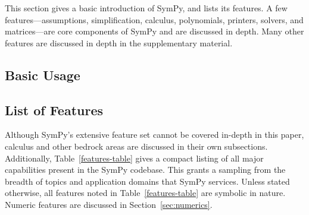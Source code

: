 This section gives a basic introduction of SymPy, and lists its features.
A few features---assumptions, simplification, calculus, polynomials, printers,
solvers, and matrices---are core components of SymPy and are discussed in
depth. Many other features are discussed in depth in the supplementary
material.

\subsection{Basic Usage}


\subsection{List of Features}

Although SymPy's extensive feature set cannot be covered in-depth in this
paper, calculus and other bedrock areas are discussed in their own
subsections. Additionally, Table~\ref{features-table} gives a compact listing
of all major capabilities present in the SymPy codebase. This grants a
sampling from the breadth of topics and application domains that SymPy
services. Unless stated otherwise, all features noted in
Table~\ref{features-table} are symbolic in nature. Numeric features are
discussed in Section~\ref{sec:numerics}.

